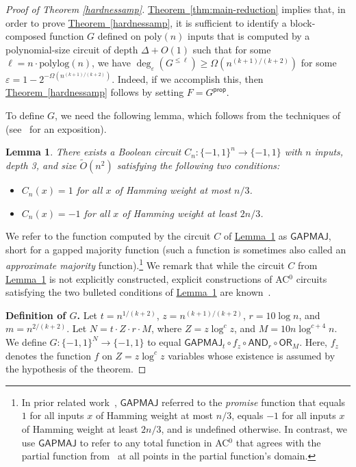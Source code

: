 \documentclass[11pt]{article}
\numberwithin{equation}{section}
\newtheorem{lemma}[theorem]{Lemma}
\theoremstyle{definition}
\theoremstyle{plain}
\newcommand{\expref}[2]{\hyperref[#2]{#1~\ref{#2}}}
\newcommand{\poly}{\mathrm{poly}}
\newcommand{\polylog}{\mathrm{polylog}}
\newcommand{\OR}{\mathsf{ OR}}
\newcommand{\GAPMAJ}{\mathsf{GAPMAJ}}
\newcommand{\bits}{\{-1,1\}}
\newcommand{\tO}{\tilde{O}}
\newcommand{\eps}{\varepsilon}
\newcommand{\AND}{\mathsf{AND}}
\begin{document}
%
\begin{proof}[Proof of Theorem \ref{hardnessamp}] 
	\expref{Theorem}{thm:main-reduction} implies that, in order to prove \expref{Theorem}{hardnessamp}, 
	it is sufficient to identify a block-composed function $G$ defined on $\poly(n)$ inputs that is computed by a 
polynomial-size %
circuit of depth $\Delta+O(1)$ such that for some $\ell=n\cdot\polylog(n)$, we have $\deg_{\eps}(G^{\leq \ell}) \geq \Omega(n^{(k+1)/(k+2)})$
	for some $\eps=1-2^{-\Omega\left(n^{(k+1)/(k+2)}\right)}$. Indeed, if we accomplish this,
	then \expref{Theorem}{hardnessamp} follows by setting $F=G^{\mathsf{prop}}$.
	
	To define $G$, we need the following lemma, which follows from the techniques of~\cite{AB84} (see~\cite{Kop13} for an exposition).
	
	\begin{lemma}\label{lem:gapmaj}
  There exists a Boolean circuit $C_n \colon \bits^n \to \bits$ with $n$ 
inputs, depth 3, and size $\tO(n^2)$ satisfying the following two
conditions:
		\begin{itemize}
	\item $C_n(x) = 1$ for all $x$ of Hamming weight at most $n/3$.
	\item $C_n(x) = -1$ for all $x$ of Hamming weight at least $2n/3$.
		\end{itemize}
	\end{lemma}

	We refer to the function computed by the circuit $C$ of \expref{Lemma}{lem:gapmaj} as $\mathsf{GAPMAJ}$, short for a gapped majority function (such a function is sometimes also called an \emph{approximate majority} function).\footnote{In prior related work~\cite{bchtv}, $\mathsf{GAPMAJ}$ referred
		to the \emph{promise} function that equals $1$ for all inputs $x$ of Hamming weight at most $n/3$, equals  $-1$ for all inputs $x$ of Hamming weight at least $2n/3$,
		and is undefined otherwise. In contrast, we use $\mathsf{GAPMAJ}$ to refer to any total function in AC$^0$ that agrees with the partial function
		from~\cite{bchtv} at all points in the partial function's domain.} We remark that while the circuit $C$ from \expref{Lemma}{lem:gapmaj} is not explicitly constructed,
explicit constructions of AC$^0$ circuits satisfying the two bulleted
conditions 
of \expref{Lemma}{lem:gapmaj} are known~\cite{viola2009approximate}.
	
	\medskip
	\noindent \textbf{Definition of $G$.} Let $t=n^{1/(k+2)}$, $z=n^{(k+1)/(k+2)}$, $r=10 \log n$, and $m=n^{2/(k+2)}$. Let $N= t \cdot Z \cdot r \cdot M$, where $Z = z \log ^c z$, and $M = 10n\log^{c+4}n$.
	We define $G \colon \bits^N \to \bits$ to equal $\GAPMAJ_t \circ f_z \circ \AND_r \circ \OR_M$. Here, $f_z$ denotes 
	the function $f$ on $Z = z \log^c z$ variables whose existence is assumed by the hypothesis of the theorem.
	

\end{proof}
\end{document}
